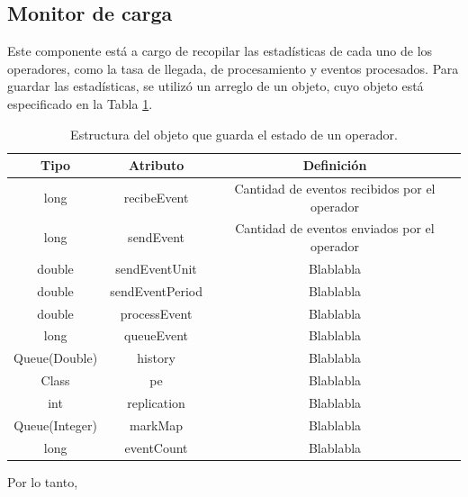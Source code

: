 
\subsection{Monitor de carga}
	Este componente está a cargo de recopilar las estadísticas de cada uno de los operadores, como la tasa de llegada, de procesamiento y eventos procesados. Para guardar las estadísticas, se utilizó un arreglo de un objeto, cuyo objeto está especificado en la Tabla \ref{tab:statusPE}.
	
\begin{table}[!ht]
\centering
\begin{tabular}{|c|c|c|}
	\hline
	Tipo & Atributo & Definición \\\hline 
	long & recibeEvent & Cantidad de eventos recibidos por el operador \\
	long & sendEvent & Cantidad de eventos enviados por el operador \\
	double & sendEventUnit & Blablabla \\
	double & sendEventPeriod & Blablabla \\
	double & processEvent & Blablabla \\
	long & queueEvent & Blablabla \\
	Queue(Double) & history & Blablabla \\
	Class & pe & Blablabla \\
	int & replication & Blablabla \\
	Queue(Integer) & markMap & Blablabla \\
	long & eventCount & Blablabla \\
	\hline
\end{tabular}
\caption{Estructura del objeto que guarda el estado de un operador.}
\label{tab:statusPE}
\end{table}

Por lo tanto, 